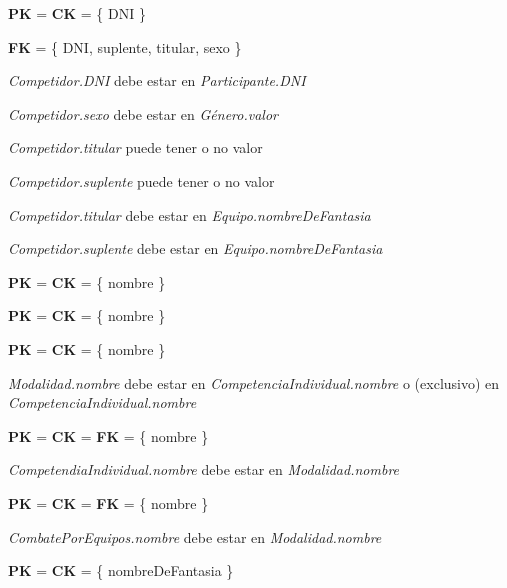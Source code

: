 \textbf{PK} = \textbf{CK} = \{ DNI \}

\textbf{FK} = \{ DNI, suplente, titular, sexo \}

\textit{Competidor.DNI} debe estar en \textit{Participante.DNI}

\textit{Competidor.sexo} debe estar en \textit{Género.valor}

\textit{Competidor.titular} puede tener o no valor

\textit{Competidor.suplente} puede tener o no valor

\textit{Competidor.titular} debe estar en \textit{Equipo.nombreDeFantasia}

\textit{Competidor.suplente} debe estar en \textit{Equipo.nombreDeFantasia}\\


\textbf{PK} = \textbf{CK} = \{ nombre \}\\


\textbf{PK} = \textbf{CK} = \{ nombre \}\\


\textbf{PK} = \textbf{CK} = \{ nombre \}

\textit{Modalidad.nombre} debe estar en \textit{CompetenciaIndividual.nombre} o (exclusivo) en \textit{CompetenciaIndividual.nombre}\\


\textbf{PK} = \textbf{CK} = \textbf{FK} = \{ nombre \}

\textit{CompetendiaIndividual.nombre} debe estar en \textit{Modalidad.nombre}\\


\textbf{PK} = \textbf{CK} = \textbf{FK} = \{ nombre \}

\textit{CombatePorEquipos.nombre} debe estar en \textit{Modalidad.nombre}\\


\textbf{PK} = \textbf{CK} = \{ nombreDeFantasia \}\\


